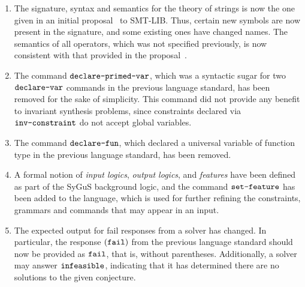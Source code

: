 \documentclass[english,a4paper,10pt]{article}
\begin{document}
\begin{enumerate}
\item
The signature, syntax and semantics for the theory of strings
is now the one given in an initial proposal~\cite{smtlibStrings} to SMT-LIB.
Thus, certain new symbols are now present in the signature,
and some existing ones have changed names.
The semantics of all operators,
which was not specified previously,
is now consistent with that provided in the proposal~\cite{smtlibStrings}.


\item The command $\texttt{declare-primed-var}$, which was a syntactic
sugar for two $\texttt{declare-var}$ commands in the previous language standard, has been removed
for the sake of simplicity.
This command did not provide any benefit to
invariant synthesis problems, since constraints declared via $\texttt{inv-constraint}$
do not accept global variables.



\item 
The command $\texttt{declare-fun}$,
which declared a universal variable of function type
in the previous language standard,
has been removed.

\item
A formal notion of \emph{input logics}, \emph{output logics}, and 
\emph{features} have been defined as part of the SyGuS background logic,
and the command $\texttt{set-feature}$ %
has been added to the language,
which is used for further refining
the constraints, grammars and commands that may appear in an input.

\item The expected output for fail responses from a solver has changed.
In particular,
the response ${\tt (fail)}$ from the previous language standard
should now be provided as ${\tt fail}$, that is, without parentheses.
Additionally, a solver may answer ${\tt infeasible}$, indicating
that it has determined there are no solutions to the given conjecture.

\end{enumerate}
\end{document}
